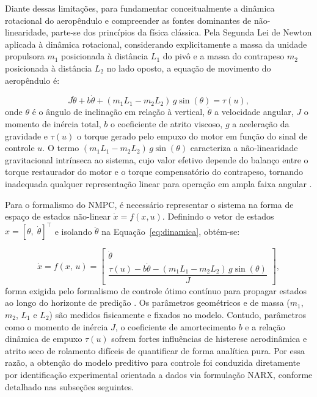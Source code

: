 Diante dessas limitações, para fundamentar conceitualmente a dinâmica rotacional do aeropêndulo e compreender as fontes dominantes de não-linearidade, parte-se dos princípios da física clássica. Pela Segunda Lei de Newton aplicada à dinâmica rotacional, considerando explicitamente a massa da unidade propulsora $m_1$ posicionada à distância $L_1$ do pivô e a massa do contrapeso $m_2$ posicionada à distância $L_2$ no lado oposto, a equação de movimento do aeropêndulo é:

\begin{equation}
    J\ddot{\theta} + b\dot{\theta} + (m_1 L_1 - m_2 L_2)\,g\sin(\theta) = \tau(u),
    \label{eq:dinamica}
\end{equation}
\noindent onde $\theta$ é o ângulo de inclinação em relação à vertical,  $\dot{\theta}$ a velocidade angular, $J$ o momento de inércia total, $b$ o  coeficiente de atrito viscoso, $g$ a aceleração da gravidade e $\tau(u)$ o  torque gerado pelo empuxo do motor em função do sinal de controle $u$. O termo  $(m_1 L_1 - m_2 L_2)\,g\sin(\theta)$ caracteriza a não-linearidade gravitacional  intrínseca ao sistema, cujo valor efetivo depende do balanço entre o torque  restaurador do motor e o torque compensatório do contrapeso, tornando inadequada  qualquer representação linear para operação em ampla faixa angular \cite{khalil2002}.

Para o formalismo do NMPC, é necessário representar o sistema na forma de  espaço de estados não-linear $\dot{x} = f(x, u)$. Definindo o vetor de estados  $x = [\theta,\;\dot{\theta}]^\top$ e isolando $\ddot{\theta}$ na  Equação~\ref{eq:dinamica}, obtém-se:

\begin{equation}
    \dot{x} = f(x,\, u) =
    \begin{bmatrix}
        \dot{\theta} \\[4pt]
        \dfrac{\tau(u) - b\dot{\theta} - (m_1 L_1 - m_2 L_2)\,g\sin(\theta)}{J}
    \end{bmatrix},
    \label{eq:estadonl}
\end{equation}
\noindent forma exigida pelo formalismo de controle ótimo contínuo para propagar estados ao longo do horizonte de predição \cite{mayne2000}. Os parâmetros geométricos e de massa ($m_1$, $m_2$, $L_1$ e $L_2$) são medidos fisicamente e fixados no modelo. Contudo, parâmetros como o momento de inércia $J$, o coeficiente de amortecimento $b$ e a relação dinâmica de empuxo $\tau(u)$ sofrem fortes influências de histerese aerodinâmica e atrito seco de rolamento difíceis de quantificar de forma analítica pura. Por essa razão, a obtenção do modelo preditivo para controle foi conduzida diretamente por identificação experimental orientada a dados via formulação NARX, conforme detalhado nas subseções seguintes.

